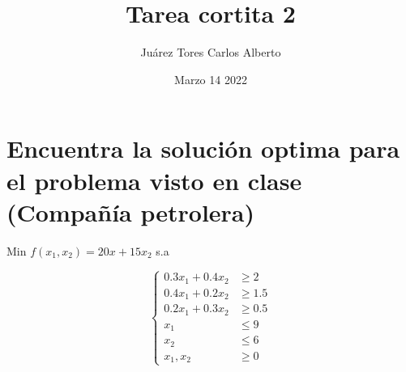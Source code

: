 \documentclass{article}
\title{Tarea cortita 2}
\author{Juárez Tores Carlos Alberto}
\date{Marzo 14 2022}
\begin{document}
\maketitle

\section*{Encuentra la solución optima para el problema visto en clase (Compañía petrolera)}
Min $f(x_1,x_2)=20x+15x_2$
s.a

$$\left\{
\begin{array}{rcl}
     0.3x_1+0.4x_2&\geq 2
  \\ 0.4x_1+0.2x_2&\geq 1.5
  \\ 0.2x_1+0.3x_2&\geq 0.5
  \\ x_1&\leq 9
  \\ x_2 &\leq 6
  \\ x_1, x_2 &\geq 0
\end{array}
\right.$$
\end{document}
